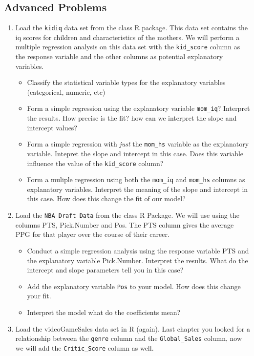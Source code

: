 \documentclass[
]{book}
\providecommand{\tightlist}{%
  \setlength{\itemsep}{0pt}\setlength{\parskip}{0pt}}
\theoremstyle{definition}
\theoremstyle{definition}
\theoremstyle{definition}
\theoremstyle{definition}
\theoremstyle{remark}
\begin{document}
\hypertarget{advanced-problems-11}{%
\subsection{Advanced Problems}\label{advanced-problems-11}}

\begin{enumerate}
\def\labelenumi{\arabic{enumi}.}
\item
  Load the \texttt{kidiq} data set from the class R package. This data set contains the iq scores for children and characteristics of the mothers. We will perform a multiple regression analysis on this data set with the \texttt{kid\_score} column as the response variable and the other columns as potential explanatory variables.

  \begin{itemize}
  \tightlist
  \item
    Classify the statistical variable types for the explanatory variables (categorical, numeric, etc)
  \item
    Form a simple regression using the explanatory variable \texttt{mom\_iq}? Interpret the results. How precise is the fit?
    how can we interpret the slope and intercept values?
  \item
    Form a simple regression with \emph{just} the \texttt{mom\_hs} variable as the explanatory variable. Intepret the slope and intercept in this case. Does this variable influence the value of the \texttt{kid\_score} column?\\
  \item
    Form a muliple regression using both the \texttt{mom\_iq} and \texttt{mom\_hs} columns as explanatory variables. Interpret the meaning of the slope and intercept in this case. How does this change the fit of our model?
  \end{itemize}
\item
  Load the \texttt{NBA\_Draft\_Data} from the class R Package. We will use using the columns PTS, Pick.Number and Pos. The PTS column gives the average PPG for that player over the course of their career.

  \begin{itemize}
  \tightlist
  \item
    Conduct a simple regression analysis using the response variable PTS and the explanatory variable Pick.Number. Interpret the results. What do the intercept and slope parameters tell you in this case?
  \item
    Add the explanatory variable \texttt{Pos} to your model. How does this change your fit.
  \item
    Interpret the model what do the coefficients mean?
  \end{itemize}
\item
  Load the videoGameSales data set in R (again). Last chapter you looked for a relationship between the \texttt{genre} column and the \texttt{Global\_Sales} column, now we will add the \texttt{Critic\_Score} column as well.


\end{enumerate}
\end{document}
